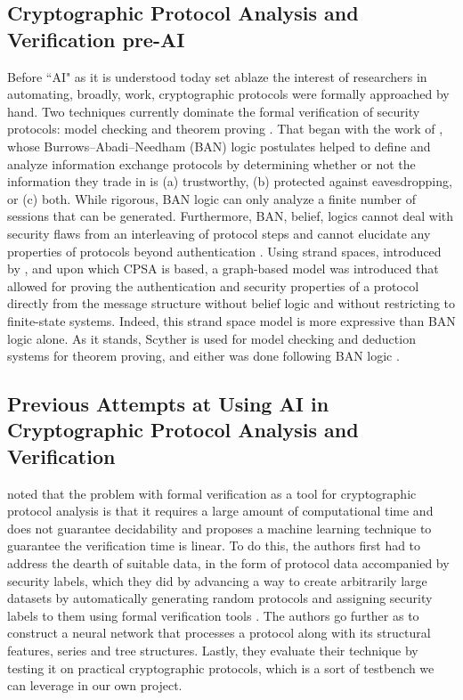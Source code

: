 \documentclass[11pt]{article}
\begin{document}
\subsection{Cryptographic Protocol Analysis and Verification pre-AI}
Before ``AI" as it is understood today set ablaze the interest of researchers in automating, broadly, work, cryptographic protocols were formally approached by hand. Two techniques currently dominate the formal verification of security protocols: model checking and theorem proving \cite{pourpouneh}. That began with the work of \cite{10.1145/77648.77649}, whose Burrows–Abadi–Needham (BAN) logic postulates helped to define and analyze information exchange protocols by determining whether or not the information they trade in is (a) trustworthy, (b) protected against eavesdropping, or (c) both. While rigorous, BAN logic can only analyze a finite number of sessions that can be generated. Furthermore, BAN, belief, logics cannot deal with security flaws from an interleaving of protocol steps and cannot elucidate any properties of protocols beyond authentication \cite{torlak2006knowledgeflowanalysissecurity}. Using strand spaces, introduced by \cite{353594.353603}, and upon which CPSA is based, a graph-based model was introduced that allowed for proving the authentication and security properties of a protocol directly from the message structure without belief logic and without restricting to finite-state systems. Indeed, this strand space model is more expressive than BAN logic alone. As it stands, Scyther is used for model checking and deduction systems for theorem proving, and either was done following BAN logic \cite{pourpouneh}.



\subsection{Previous Attempts at Using AI in Cryptographic Protocol Analysis and Verification}
\label{sec:aiprotocol}
\cite{ohno2023securityverificationframeworkcryptographic} noted that the problem with formal verification as a tool for cryptographic protocol analysis is that it requires a large amount of computational time and does not guarantee decidability and proposes a machine learning technique to guarantee the verification time is linear. To do this, the authors first had to address the dearth of suitable data, in the form of protocol data accompanied by security labels, which they did by advancing a way to create arbitrarily large datasets by automatically generating random protocols and assigning security labels to them
using formal verification tools \cite{ohno2023securityverificationframeworkcryptographic}. The authors go further as to construct a neural network that processes a protocol along with its structural features, series and tree structures. Lastly, they evaluate their technique by testing it on practical cryptographic protocols, which is a sort of testbench we can leverage in our own project. 
\end{document}
